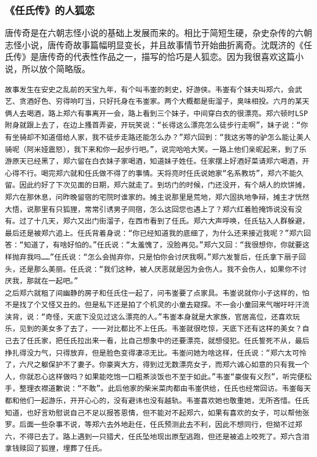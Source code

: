 \documentclass[UTF8, 12pt, A4paper]{article}
\begin{document}
\subsubsection{《任氏传》的人狐恋}

唐传奇是在六朝志怪小说的基础上发展而来的。相比于简短生硬，杂史杂传的六朝志怪小说，唐传奇故事篇幅明显变长，并且故事情节开始曲折离奇。沈既济的《任氏传》是唐传奇的代表性作品之一，描写的恰巧是人狐恋。因为我很喜欢这篇小说，所以放个简略版。

\begin{lstlisting}
故事发生在安史之乱前的天宝九年，有个叫韦崟的刺史，好游侠。韦崟有个妹夫叫郑六，会武艺、贪酒好色、穷得响叮当，只好托身在韦崟家。两个大概都是街溜子，臭味相投。六月的某天俩人去喝酒，路上郑六有事离开一会，路上看到三个妹子，中间穿白衣的很漂亮。郑六顿时LSP附身就跟上去了，在边上搔首弄姿，开玩笑说：“长得这么漂亮怎么徒步行走啊”，妹子说：“你有坐骑却不知道借给人家，我不徒步走路还能怎么办？”郑六回到：“我这劣等的驴怎么能让美人骑呢（阿米娅震怒），我下来和你一起步行吧。”，说完哈哈大笑。一路上他们亲昵起来，到了乐游原天已经黑了，郑六留在白衣妹子家喝酒，知道妹子姓任。任家摆上好酒好菜请郑六喝酒，开心得不行。喝完郑六就和任氏做不得了的事情。天将亮时任氏说她家“名系教坊”，郑六不能久留。因此约好了下次见面的日期，郑六就走了。到坊门的时候，门还没开，有个胡人的炊饼摊，郑六在那休息，问昨晚留宿的宅院时谁家的。摊主说那里是荒地，郑六固执地争辩，摊主才恍然大悟，说那里有只狐狸，常常引诱男子同宿，怎么这回您也遇上了？郑六红着脸掩饰说没有没有。过了十几天，郑六又出门街溜子，在西市看到了任氏。郑六大声呼唤，任氏钻入人群躲避，最后还是被郑六追上。任氏背着身说：“你已经知道我的底细了，为什么还来接近我呢？”郑六回答：“知道了，有啥好怕的。”任氏说：“太羞愧了，没脸再见。”郑六又回：“我很想你，你就要这样抛弃我吗……”任氏说：“怎么会抛弃你，只是怕你会讨厌我啊。”郑六发誓后，任氏拿下扇子回头，还是那么美丽。任氏说：“我们这种，被人厌恶就是因为会伤人。我不会伤人，如果你不讨厌我，那就在一起吧。”
之后郑六就租了间幽静的房子和任氏住一起了，问韦崟要了点家具。韦崟说就你小子这样的，怕不是找了个又怪又丑的。但是私下还是拍了个机灵的小童去窥探。不一会小童回来气喘吁吁汗流浃背，说：“奇怪，天底下没见过这么漂亮的人。”韦崟本身就是大家族，官居高位，还喜欢玩乐，见到的美女多了去了，一一对比都比不上任氏。韦崟就很吃惊，天底下还有这样的美女？自己去了任氏家，把任氏拉出来一看，比自己想象中的还要漂亮，就想侵犯。任氏誓死不从，最后挣扎得没力气，只得放弃，但是脸色变得凄凉无比。韦崟问她为啥这样，任氏说：“郑六太可怜了，六尺之躯保护不了妻子。你豪爽大方，得到过无数漂亮女子，而郑六诚心如意的只有我一个人，你就忍心这样做吗？如果能吃饱一口粗茶淡饭也不至于如此。”韦崟“豪俊有义烈”，听完便松手，整理衣襟道歉说：“不敢”。此后他家的柴米菜肉都由韦崟供给，任氏也经常回访。韦崟每天都和他们一起游乐，开开心心的，没有避讳也没有越轨。韦崟喜欢她也敬重她，无所吝惜。任氏知道，也好言劝慰说自己不足以报答恩情，但不能对不起郑六，如果有喜欢的女子，可以帮他张罗。后面一些杂事不说，等郑六去外地赴任，任氏预测此去不利，因此不想同行，但拗不过郑六，不得已去了。路上遇到一只猎犬，任氏坠地现出原型逃跑，但还是被追上咬死了。郑六含泪拿钱赎回了狐狸，埋葬了任氏。
\end{lstlisting}
\end{document}
